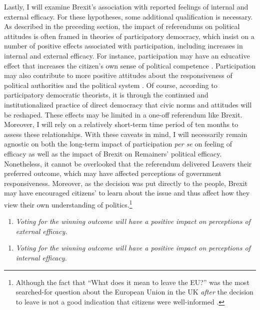 \documentclass[12pt, letter]{article}
\begin{document}
Lastly, I will examine Brexit's association with reported feelings of internal and external efficacy. For these hypotheses, some additional qualification is necessary. As described in the preceding section, the impact of referendums on political attitudes is often framed in theories of participatory democracy, which insist on a number of positive effects associated with participation, including increases in internal and external efficacy. For instance, participation may have an educative effect that increases the citizen's own sense of political competence \parencite{pateman1970participation, barber2003strong}. Participation may also contribute to more positive attitudes about the responsiveness of political authorities and the political system \parencite{finkel1985reciprocal}. Of course, according to participatory democratic theorists, it is through the continued and institutionalized practice of direct democracy that civic norms and attitudes will be reshaped. These effects may be limited in a one-off referendum like Brexit. Moreover, I will rely on a relatively short-term time period of ten months to assess these relationships. With these caveats in mind, I will necessarily remain agnostic on both the long-term impact of participation \textit{per se} on feeling of efficacy as well as the impact of Brexit on Remainers' political efficacy. Nonetheless, it cannot be overlooked that the referendum delivered Leavers their preferred outcome, which may have affected perceptions of government responsiveness. Moreover, as the decision was put directly to the people, Brexit may have encouraged citizens' to learn about the issue and thus affect how they view their own understanding of politics.\footnote{Although the fact that ``What does it mean to leave the EU?'' was the most searched-for question about the European Union in the UK \textit{after} the decision to leave is not a good indication that citizens were well-informed \parencite{selyukh2016after}.}

\vspace{12pt}
\begin{enumerate}[label= \textbf{Hypothesis 4a (H4a)},  leftmargin=*]
  \item \textit{Voting for the winning outcome will have a positive impact on perceptions of \textit{external} efficacy.}
\end{enumerate}

\begin{enumerate}[label= \textbf{Hypothesis 4b (H4b)},  leftmargin=*]
  \item \textit{Voting for the winning outcome will have a positive impact on perceptions of \textit{internal} efficacy.}
\end{enumerate}
\end{document}

